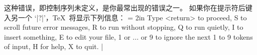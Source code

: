 这种错误，即控制序列未定义，是你最常出现的错误之一。
如果你在提示符后键入另一个 `|?|'，\TeX\ 将显示下列信息：
{\hfuzz = 2in
\csdisplay
Type <return> to proceed, S to scroll future error messages,
R to run without stopping, Q to run quietly,
I to insert something, E to edit your file,
1 or ... or 9 to ignore the next 1 to 9 tokens of input,
H for help, X to quit.
|
}%
